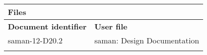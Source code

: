 \small
\begin{tabularx}{\textwidth}{|L|p{11cm}|}
\caption*{\textbf{Files}}\label{tab:files}\\
\toprule
\textbf{Document identifier} & \textbf{User file}\\
\midrule
saman-12-D20.2 & saman: Design Documentation\\
\midrule
& \\
\bottomrule
\end{tabularx}